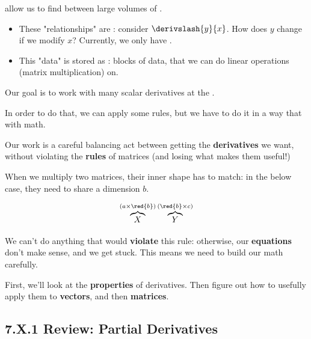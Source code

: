     \begin{concept}
         allow us to find  between large volumes of .
        
        \begin{itemize}
            \item These "relationships" are : consider $\derivslash{y}{x}$. How does $y$ change if we modify $x$? Currently, we only have .
            
            \item This "data" is stored as : blocks of data, that we can do linear operations (matrix multiplication) on.
        \end{itemize}
        
        Our goal is to work with many scalar derivatives at the . 
        
        In order to do that, we can apply some  rules, but we have to do it in a way that  with  math.
    \end{concept}
    
    Our work is a careful balancing act between getting the \textbf{derivatives} we want, without violating the \textbf{rules} of matrices (and losing what makes them useful!)
    
    \miniex When we multiply two matrices, their inner shape has to match: in the below case, they need to share a dimension $b$.
    
    \begin{equation}
        \overbrace{
            X
        }^{ (a \times \red{b}) }
        \overbrace{
            Y
        }^{(\red{b} \times c)}
    \end{equation}
    
    We can't do anything that would \textbf{violate} this rule: otherwise, our \textbf{equations} don't make sense, and we get stuck. This means we need to build our math carefully.
    
    First, we'll look at the \textbf{properties} of derivatives. Then figure out how to usefully apply them to \textbf{vectors}, and then \textbf{matrices}.
    
    \secdiv
    
    \subsection*{7.X.1 \quad Review: Partial Derivatives}
    
